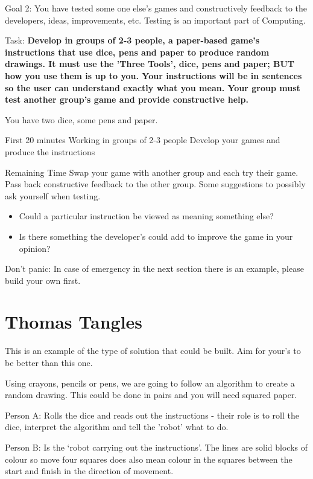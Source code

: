 Goal 2: You have tested some one else's games and constructively feedback to the developers, ideas, improvements, etc. Testing is an important part of Computing.


Task: \textbf{Develop in groups of 2-3 people, a paper-based game's instructions that use dice, pens and paper to produce random drawings. It must use the 'Three Tools', dice, pens and paper; BUT how you use them is up to you. Your instructions will be in sentences so the user can understand exactly what you mean. Your group must test another group's game and provide constructive help.} 


You have two dice, some pens and paper.

First 20 minutes
Working in groups of 2-3 people
Develop your games and produce the instructions

Remaining Time
Swap your game with another group and each try their game. Pass back constructive feedback to the other group. Some suggestions to possibly ask yourself when testing.
\begin{itemize}
    \item Could a particular instruction be viewed as meaning something else?
    \item Is there something the developer's could add to improve the game in your opinion?
\end{itemize}

Don't panic: In case of emergency in the next section there is an example, please build your own first.


\section{Thomas Tangles}
This is an example of the type of solution that could be built. Aim for your's to be better than this one.

Using crayons, pencils or pens, we are going to follow an algorithm to create a random drawing. This could be done in pairs and you will need squared paper. 

Person A: Rolls the dice and reads out the instructions - their role is to roll the dice, interpret the algorithm and tell the 'robot' what to do.

Person B: Is the ‘robot carrying out the instructions'. The lines are solid blocks of colour so move four squares does also mean colour in the squares between the start and finish in the direction of movement.

